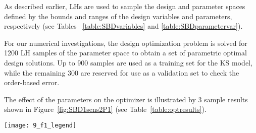 As described earlier, \acp{LH} are used to sample the design and parameter spaces defined by the bounds and ranges of the design variables and parameters, respectively (see Tables 
~\ref{table:SBDvariables} and \ref{table:SBDparametervar}).

For our numerical investigations, the design optimization problem is solved for 1200 \ac{LH} samples of the parameter space to obtain a set of parametric optimal design solutions. Up to 900 samples are used as a training set for the \ac{KS} model, while the remaining 300 are reserved for use as a validation set to check the order-based error.

The effect of the parameters on the optimizer is illustrated by 3 sample results shown in Figure~\ref{fig:SBD1sens2P1} (see Table~\ref{table:optresults}).

\begin{figure*}%
	\centering
	\texttt{[image: 9\_f1\_legend]} \vspace{-0.02\textwidth}\\
	 \hspace{0.03\textwidth}%
	 \hspace{0.03\textwidth}%
	\caption{Three sample parametric optimal designs; $x_0$ denotes the baseline design}
	\label{fig:SBD1sens2P1}
\end{figure*}
